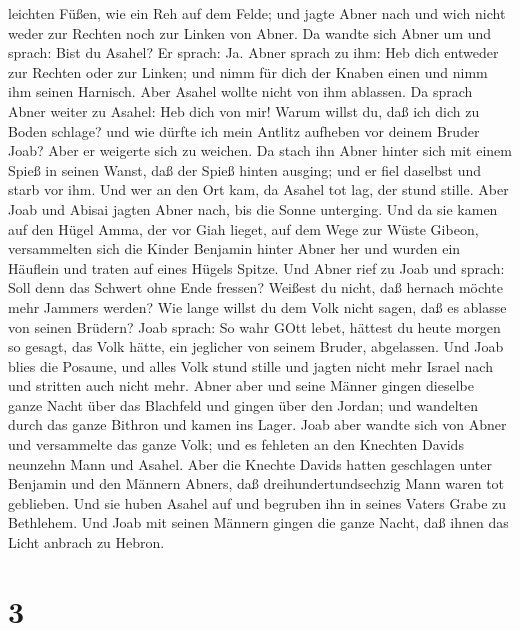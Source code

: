 leichten Füßen, wie ein Reh auf dem Felde;  und jagte Abner
nach und wich nicht weder zur Rechten noch zur Linken von Abner.
 Da wandte sich Abner um und sprach: Bist du Asahel? Er
sprach: Ja.  Abner sprach zu ihm: Heb dich entweder zur
Rechten oder zur Linken; und nimm für dich der Knaben einen und nimm ihm
seinen Harnisch. Aber Asahel wollte nicht von ihm ablassen.
 Da sprach Abner weiter zu Asahel: Heb dich von mir! Warum
willst du, daß ich dich zu Boden schlage? und wie dürfte ich mein
Antlitz aufheben vor deinem Bruder Joab?  Aber er weigerte
sich zu weichen. Da stach ihn Abner hinter sich mit einem Spieß in
seinen Wanst, daß der Spieß hinten ausging; und er fiel daselbst und
starb vor ihm. Und wer an den Ort kam, da Asahel tot lag, der stund
stille.  Aber Joab und Abisai jagten Abner nach, bis die
Sonne unterging. Und da sie kamen auf den Hügel Amma, der vor Giah
lieget, auf dem Wege zur Wüste Gibeon,  versammelten sich
die Kinder Benjamin hinter Abner her und wurden ein Häuflein und traten
auf eines Hügels Spitze.  Und Abner rief zu Joab und
sprach: Soll denn das Schwert ohne Ende fressen? Weißest du nicht, daß
hernach möchte mehr Jammers werden? Wie lange willst du dem Volk nicht
sagen, daß es ablasse von seinen Brüdern?  Joab sprach: So
wahr GOtt lebet, hättest du heute morgen so gesagt, das Volk hätte, ein
jeglicher von seinem Bruder, abgelassen.  Und Joab blies
die Posaune, und alles Volk stund stille und jagten nicht mehr Israel
nach und stritten auch nicht mehr.  Abner aber und seine
Männer gingen dieselbe ganze Nacht über das Blachfeld und gingen über
den Jordan; und wandelten durch das ganze Bithron und kamen ins Lager.
 Joab aber wandte sich von Abner und versammelte das ganze
Volk; und es fehleten an den Knechten Davids neunzehn Mann und Asahel.
 Aber die Knechte Davids hatten geschlagen unter Benjamin
und den Männern Abners, daß dreihundertundsechzig Mann waren tot
geblieben.  Und sie huben Asahel auf und begruben ihn in
seines Vaters Grabe zu Bethlehem. Und Joab mit seinen Männern gingen die
ganze Nacht, daß ihnen das Licht anbrach zu Hebron.

\hypertarget{section-2}{%
\section{3}\label{section-2}}

